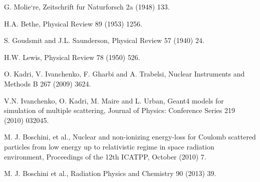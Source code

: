 
 G. Molie`re,
                     Zeitschrift fur Naturforsch 2a (1948) 133.

 H.A. Bethe,
                     Physical Review 89 (1953) 1256.

 S. Goudsmit and J.L. Saunderson,
                     Physical Review 57 (1940) 24.

 H.W. Lewis,
                     Physical Review 78 (1950) 526.

 O. Kadri, V. Ivanchenko, F. Gharbi and A. Trabelsi,
                      Nuclear Instruments and Methods B 267 (2009) 3624.

 V.N. Ivanchenko, O. Kadri, M. Maire and L. Urban, 
                     Geant4 models for simulation of multiple scattering, 
                     Journal of Physics: Conference Series 219 (2010) 032045.

 M. J. Boschini, et al., Nuclear and non-ionizing energy-loss
                     for Coulomb scattered particles from low energy up to 
                     relativistic regime in space radiation environment, 
                     Proceedings of the 12th ICATPP, October (2010) 7.

 M. J. Boschini et al.,
                     Radiation Physics and Chemistry 90 (2013) 39.

